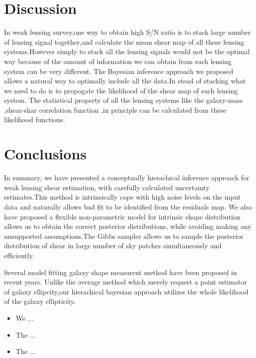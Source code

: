 \documentclass[useAMS,usenatbib]{mn2e}
\begin{document}



\section{Discussion}

\label{sec:XXX} In weak lensing survey,one way to obtain high S/N
ratio is to stack large number of lensing signal together,and calculate
the mean shear map of all these lensing systems.However simply to
stack all the lensing signals would not be the optimal way because
of the amount of information we can obtain from each lensing system
can be very different. The Bayesian inference approach we proposed
allows a natural way to optimally include all the data.In stead of
stacking what we need to do is to propogate the likelihood of the
shear map of each lensing system. The statistical property of all
the lensing systems like the galaxy-mass ,shear-shar correlation function
,in principle can be calculated from these likelihood functions.






\section{Conclusions}

\label{sec:conclusions}

In summary, we have presented a conceptually hierachical inference
approach for weak lensing shear estimation, with carefully calculated 
uncertainty estimates.This method is intrinsically cope with high noise
levels on the input data and naturally allows bad fit to be identified 
from the residuals map. We also have proposed a flexible non-parametric model 
for intrinsic shape distribution allows us to obtain the correct posterior 
distributions, while avoiding making any unsupported assumptions.The Gibbs
sampler allows us to sample the posterior distribution of shear in large number of
sky patches simultaneously and efficiently.

Several  model fitting galaxy shape measurent method have been proposed in recent years.
Unlike the average method which merely request a point estimator of galaxy ellipcity,our 
hierachical bayesian approach utilizes the whole likelihood of the galaxy ellipticity.
\begin{itemize}
\item We ...
\item The ...
\item The ...
\end{itemize}
\end{document}

